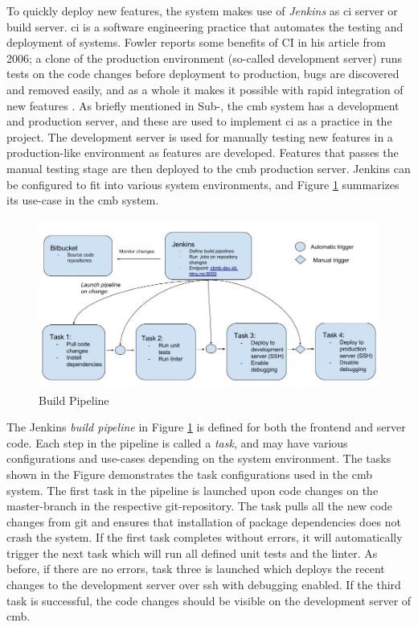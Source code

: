To quickly deploy new features, the system makes use of \textit{Jenkins} \cite{JENKINS} as \gls{ci} server or build server. \gls{ci} is a software engineering practice that automates the testing and deployment of systems. Fowler reports some benefits of CI in his article from 2006; a clone of the production environment (so-called development server) runs tests on the code changes before deployment to production, bugs are discovered and removed easily, and as a whole it makes it possible with rapid integration of new features \cite{a:F:CI}. As briefly mentioned in Sub-, the \gls{cmb} system has a development and production server, and these are used to implement \gls{ci} as a practice in the project. The development server is used for manually testing new features in a production-like environment as features are developed. Features that passes the manual testing stage are then deployed to the \gls{cmb} production server. Jenkins can be configured to fit into various system environments, and Figure \ref{fig:server-ci} summarizes its use-case in the \gls{cmb} system. \\

\begin{figure}
  \includegraphics[width=1.0\textwidth]{figs/build_pipeline.jpg}
  \caption[Build Pipeline]{Build Pipeline}
  \label{fig:server-ci}
\end{figure}

The Jenkins \textit{build pipeline} in Figure \ref{fig:server-ci} is defined for both the frontend and server code. Each step in the pipeline is called a \textit{task}, and may have various configurations and use-cases depending on the system environment. The tasks shown in the Figure demonstrates the task configurations used in the \gls{cmb} system. The first task in the pipeline is launched upon code changes on the master-branch in the respective git-repository. The task pulls all the new code changes from git and ensures that installation of package dependencies does not crash the system. If the first task completes without errors, it will automatically trigger the next task which will run all defined unit tests and the linter. As before, if there are no errors, task three is launched which deploys the recent changes to the development server over \gls{ssh} with debugging enabled. If the third task is successful, the code changes should be visible on the development server of \gls{cmb}. \\


